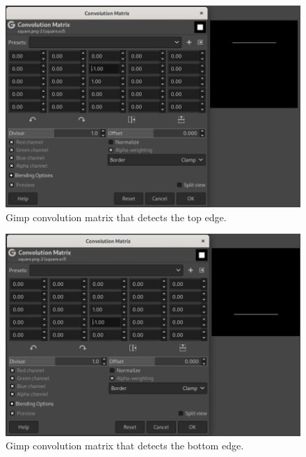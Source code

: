 \documentclass[
  letterpaper,
]{krantz}
\begin{document}
\begin{figure}[H]

{\centering \includegraphics{images/images-square-top.png}

}

\caption{\label{fig-images-square-top}Gimp convolution matrix that
detects the top edge.}

\end{figure}

\begin{figure}[H]

{\centering \includegraphics{images/images-square-bottom.png}

}

\caption{\label{fig-images-square-bottom}Gimp convolution matrix that
detects the bottom edge.}

\end{figure}
\end{document}
